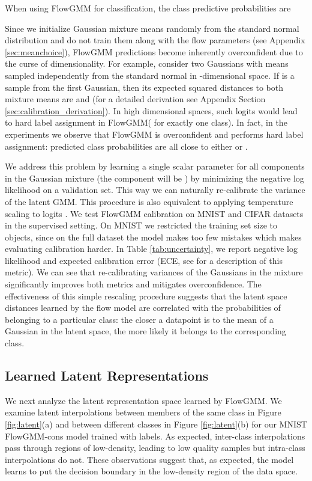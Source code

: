 \documentclass{article}
\newcommand{\method}{FlowGMM\xspace}
\newcommand{\methodcons}{FlowGMM-cons\xspace}
\begin{document}
When using \method for classification, the class predictive probabilities are 

Since we initialize Gaussian mixture means randomly from the standard normal distribution and do not train them along with the flow parameters (see Appendix \ref{sec:meanchoice}), \method predictions become inherently overconfident due to the curse of dimensionality.
For example, consider two Gaussians with means sampled independently from the standard normal  in -dimensional space.  If  is a sample from the first Gaussian, then its expected squared distances to both mixture means are  and  (for a detailed derivation see Appendix Section \ref{sec:calibration_derivation}). In high dimensional spaces, such logits would lead to hard label assignment in \method ( for exactly one class).
In fact, in the experiments we observe that \method is overconfident and performs hard label assignment: predicted class probabilities are all close to either  or . 

We address this problem by learning a single scalar parameter  for all components in the Gaussian mixture (the component  will be ) by minimizing the negative log likelihood on a validation set. This way we can naturally re-calibrate the variance of the latent GMM.
This procedure is also equivalent to applying temperature scaling \citep{weinberger2017calibration} to logits .
We test FlowGMM calibration on MNIST and CIFAR datasets in the supervised setting.
On MNIST we restricted the training set size to  objects, since on the full dataset the model makes too few mistakes which makes evaluating calibration harder. 
In Table \ref{tab:uncertainty}, we report negative log likelihood and expected calibration error 
(ECE, see \citet{weinberger2017calibration} for  a description of this metric).
We can see that re-calibrating variances of the Gaussians in the mixture significantly improves both metrics and mitigates overconfidence. 
The effectiveness of this simple rescaling procedure suggests that the latent space distances learned by the flow model are correlated with the probabilities of belonging to a particular class: the closer a datapoint is to the mean of a Gaussian in the latent space, the more likely it belongs to the corresponding class.


\subsection{Learned Latent Representations}
\label{sec:analysis_latent}

We next analyze the latent representation space learned by \method. 
We examine latent interpolations between members of the same class
in Figure \ref{fig:latent}(a) and between different classes in Figure 
\ref{fig:latent}(b) for our MNIST \methodcons model trained with  labels. 
As expected, inter-class interpolations pass through regions of low-density, leading to low quality samples but intra-class interpolations do not.
These observations suggest that, as expected, the model learns to put the decision boundary in the low-density region of the data space.
\end{document}
